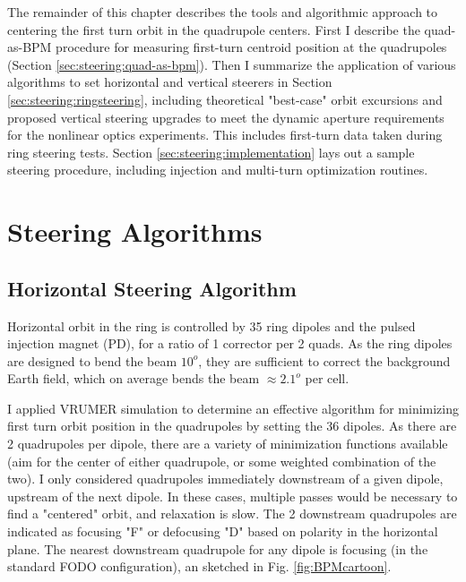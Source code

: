 The remainder of this chapter describes the tools and algorithmic approach to centering the first turn orbit in the quadrupole centers. First I describe the quad-as-BPM procedure for measuring first-turn centroid position at the quadrupoles (Section \ref{sec:steering:quad-as-bpm}). Then I summarize the application of various algorithms to set horizontal and vertical steerers in Section \ref{sec:steering:ringsteering}, including theoretical "best-case" orbit excursions and proposed vertical steering upgrades to meet the dynamic aperture requirements for the nonlinear optics experiments. This includes first-turn data taken during ring steering tests.
Section \ref{sec:steering:implementation} lays out a sample steering procedure, including injection and multi-turn optimization routines. 



 

 



\section{Steering Algorithms} \label{sec:steering:steeringalgorithm}




\subsection{Horizontal Steering Algorithm}

Horizontal orbit in the ring is controlled by 35 ring dipoles and the pulsed injection magnet (PD), for a ratio of 1 corrector per 2 quads. As the ring dipoles are designed to bend the beam $10^o$, they are sufficient to correct the background Earth field, which on average bends the beam $\approx 2.1^o$ per cell. 

I applied VRUMER simulation to determine an effective algorithm for minimizing first turn orbit position in the quadrupoles by setting the 36 dipoles. As there are 2 quadrupoles per dipole, there are a variety of minimization functions available (aim for the center of either quadrupole, or some weighted combination of the two). I only considered quadrupoles immediately downstream of a given dipole, upstream of the next dipole. In these cases, multiple passes would be necessary to find a "centered" orbit, and relaxation is slow. The 2 downstream quadrupoles are indicated as focusing "F" or defocusing "D" based on polarity in the horizontal plane. The nearest downstream quadrupole for any dipole is focusing (in the standard FODO configuration), an sketched in Fig. \ref{fig:BPMcartoon}.
 

